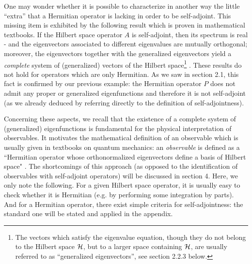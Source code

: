 \documentclass[12pt]{report}
\begin{document}
One may wonder whether it is possible to characterize in another 
way the little ``extra'' that a 
Hermitian operator is lacking in order to  
be self-adjoint. This missing item 
is exhibited by the following
result which is proven in mathematical textbooks. 
If the Hilbert space operator $A$ is self-adjoint, then  
its spectrum is real \cite{ri,sg}\cite{af}-\cite{krey} and 
the eigenvectors associated to different eigenvalues 
are mutually orthogonal; moreover, the eigenvectors together 
with the generalized eigenvectors
 yield a {\em complete} 
system of (generalized) vectors of the Hilbert space\footnote{The 
vectors which satisfy the eigenvalue equation, though they 
do not belong to the Hilbert space ${\cal H}$, but to a larger space 
containing ${\cal H}$, are usually referred to as 
``generalized eigenvectors'', 
see section 2.2.3 below.} 
\cite{gv,bere,sg}.
These results do not hold for operators which are 
only Hermitian. 
As we saw in section 2.1, 
this fact is confirmed by our previous example:
the Hermitian operator $P$ does not admit any 
proper or generalized eigenfunctions 
and therefore it is not self-adjoint (as we already 
deduced by referring directly to the 
 definition of self-adjointness).  

Concerning these aspects, we recall 
that the existence of a complete 
 system of (generalized)
eigenfunctions is fundamental 
 for the physical interpretation of 
observables. It motivates the mathematical definition of an observable 
which is usually given in textbooks on 
quantum mechanics: an  
{\em observable} is defined as a ``Hermitian operator 
whose orthonormalized eigenvectors define a basis of Hilbert 
space" \cite{ct}. 
The shortcomings of this approach (as opposed to 
the identification of observables with self-adjoint operators)
will be discussed in section 4. Here, we only note 
the following. 
For a given Hilbert space operator, it is usually 
 easy to check whether it is Hermitian (e.g. by performing
 some integration by parts). 
And for a Hermitian operator, 
there exist 
simple criteria for self-adjointness: the 
standard one will be 
stated and applied in the appendix. 
\end{document}
